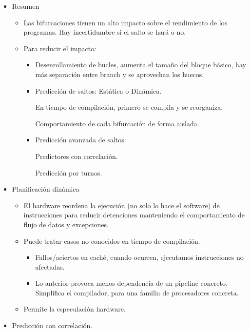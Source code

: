 \documentclass[12pt, twoside, openright]{report} %
\begin{document}
\begin{itemize}
  \item Resumen

    \begin{itemize}
    
    \item
      Las bifurcaciones tienen un alto impacto sobre el rendimiento de
      los programas. Hay incertidumbre si el salto se hará o no.
    \item
      Para reducir el impacto:

      \begin{itemize}
      
      \item
        Desenrollamiento de bucles, aumenta el tamaño del bloque básico,
        hay más separación entre branch y se aprovechan los huecos.
      \item
        Predicción de saltos: Estática o Dinámica.

        
          En tiempo de compilación, primero se compila y se reorganiza.

          Comportamiento de cada bifurcación de forma aislada.
      \item
        Predicción avanzada de saltos:

        
          Predictores con correlación.
          
          Predicción por turnos.
        \end{itemize}
      \end{itemize}
  \item Planificación dinámica

    \begin{itemize}
    
    \item
      El hardware reordena la ejecución (no solo lo hace el software) de
      instrucciones para reducir detenciones manteniendo el
      comportamiento de flujo de datos y excepciones.
    \item
      Puede tratar casos no conocidos en tiempo de compilación.

      \begin{itemize}
      
      \item
        Fallos/aciertos en caché, cuando ocurren, ejecutamos
        instrucciones no afectadas.
      \item
        Lo anterior provoca menos dependencia de un pipeline concreto.
        Simplifica el compilador, para una familia de procesadores
        concreta.
      \end{itemize}
    \item
      Permite la especulación hardware.
    \end{itemize}
  \item Predicción con correlación.


\end{itemize}
\end{document}
